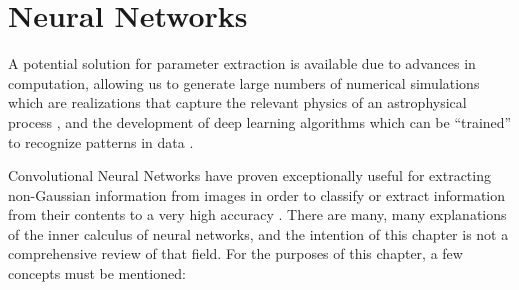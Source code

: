 \section{Neural Networks}

A potential solution for parameter extraction is available due to advances in computation, allowing us to generate large numbers of numerical simulations which are realizations that capture the relevant physics of an astrophysical process \citep[e.g.][]{Mesinger.11}, and the development of deep learning algorithms which can be ``trained'' to recognize patterns in data \citep[e.g.][]{Hinton.06, Hinton.12}.

Convolutional Neural Networks \citep[CNNs; e.g.][]{Lecun.95} have proven exceptionally useful for extracting non-Gaussian information from images in order to classify or extract information from their contents to a very high accuracy \citep[e.g.][]{imagenet.12}. There are many, many explanations of the inner calculus of neural networks, and the intention of this chapter is not a comprehensive review of that field. For the purposes of this chapter, a few concepts must be mentioned:


